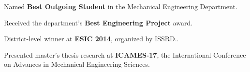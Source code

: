 \begin{zitemize}
\item Named \textbf{Best Outgoing Student} in the Mechanical Engineering Department.
\item Received the department's \textbf{Best Engineering Project} award.
\item District-level winner at \textbf{ESIC 2014}, organized by ISSRD\@..
\item Presented master's thesis research at \textbf{ICAMES-17}, the International Conference on Advances in Mechanical Engineering Sciences.
\end{zitemize}

